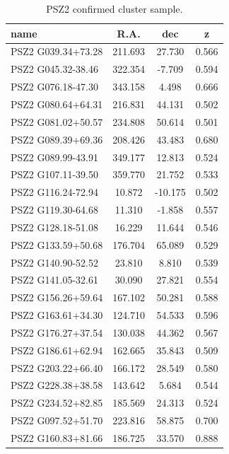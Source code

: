 \documentclass[11pt,a4paper,twoside,graphicx,color]{article}
\begin{document}
\begin{table}
\begin{tabular}{|l  || c | c | c | }
  \hline                       
name  &  R.A.  & dec  &   z \\ \hline
PSZ2 G039.34+73.28 & 211.693 &  27.730 &   0.566 \\ \hline
PSZ2 G045.32-38.46 & 322.354 &  -7.709 &   0.594 \\ \hline
PSZ2 G076.18-47.30 & 343.158 &   4.498 &   0.666 \\ \hline
PSZ2 G080.64+64.31 & 216.831 &  44.131 &   0.502 \\ \hline
PSZ2 G081.02+50.57 & 234.808 &  50.614 &   0.501 \\ \hline
PSZ2 G089.39+69.36 & 208.426 &  43.483 &   0.680 \\ \hline
PSZ2 G089.99-43.91 & 349.177 &  12.813 &   0.524 \\ \hline
PSZ2 G107.11-39.50 & 359.770 &  21.752 &   0.533 \\ \hline
PSZ2 G116.24-72.94 &  10.872 & -10.175 &   0.502 \\ \hline
PSZ2 G119.30-64.68 &  11.310 &  -1.858 &   0.557 \\ \hline
PSZ2 G128.18-51.08 &  16.229 &  11.644 &   0.546 \\ \hline
PSZ2 G133.59+50.68 & 176.704 &  65.089 &   0.529 \\ \hline
PSZ2 G140.90-52.52 &  23.810 &   8.810 &   0.539 \\ \hline
PSZ2 G141.05-32.61 &  30.090 &  27.821 &   0.554 \\ \hline
PSZ2 G156.26+59.64 & 167.102 &  50.281 &   0.588 \\ \hline
PSZ2 G163.61+34.30 & 124.710 &  54.533 &   0.596 \\ \hline
PSZ2 G176.27+37.54 & 130.038 &  44.362 &   0.567 \\ \hline
PSZ2 G186.61+62.94 & 162.665 &  35.843 &   0.509 \\ \hline
PSZ2 G203.22+66.40 & 166.172 &  28.549 &   0.580 \\ \hline
PSZ2 G228.38+38.58 & 143.642 &   5.684 &   0.544 \\ \hline
PSZ2 G234.52+82.85 & 185.569 &  24.313 &   0.524 \\ \hline
PSZ2 G097.52+51.70 & 223.816 &  58.875 &   0.700 \\ \hline
PSZ2 G160.83+81.66 & 186.725 &  33.570 &   0.888 \\ \hline
\end{tabular}
\label{tab:PSZ2_sample}
 \caption{PSZ2 confirmed cluster sample.}
\end{table}
\end{document}
